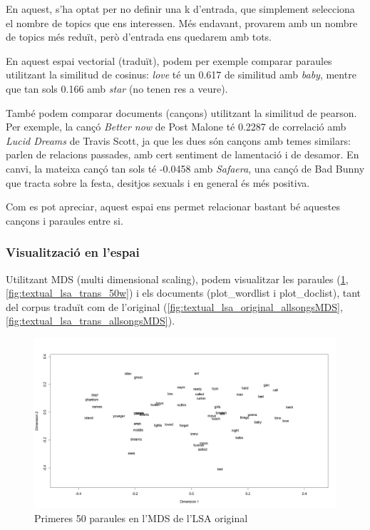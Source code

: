 En aquest, s'ha optat per no definir una k d'entrada, que simplement selecciona el nombre de topics que ens interessen. Més endavant, provarem amb un nombre de topics més reduït, però d'entrada ens quedarem amb tots.

En aquest espai vectorial (traduït), podem per exemple comparar paraules utilitzant la similitud de cosinus: \textit{love} té un 0.617 de similitud amb \textit{baby}, mentre que tan sols 0.166 amb \textit{star} (no tenen res a veure).

També podem comparar documents (cançons) utilitzant la similitud de pearson. Per exemple, la cançó \textit{Better now} de Post Malone té 0.2287 de correlació amb \textit{Lucid Dreams} de Travis Scott, ja que les dues són cançons amb temes similars: parlen de relacions passades, amb cert sentiment de lamentació i de desamor. En canvi, la mateixa cançó tan sols té -0.0458 amb \textit{Safaera}, una cançó de Bad Bunny que tracta sobre la festa, desitjos sexuals i en general és més positiva.

Com es pot apreciar, aquest espai ens permet relacionar bastant bé aquestes cançons i paraules entre si. 

\subsubsection{Visualització en l'espai}
Utilitzant MDS (multi dimensional scaling), podem visualitzar les paraules (\ref{fig:textual_lsa_original_50w}, \ref{fig:textual_lsa_trans_50w}) i els documents (plot\_wordlist i plot\_doclist), tant del corpus traduït com de l'original (\ref{fig:textual_lsa_original_allsongsMDS}, \ref{fig:textual_lsa_trans_allsongsMDS}).

\begin{figure}[H]
    \centering
    \includegraphics[width=0.8\linewidth]{Images//8_Textual//LSA/orignal_first_50_words.png}
    \caption{Primeres 50 paraules en l'MDS de l'LSA original}
    \label{fig:textual_lsa_original_50w}
\end{figure}


